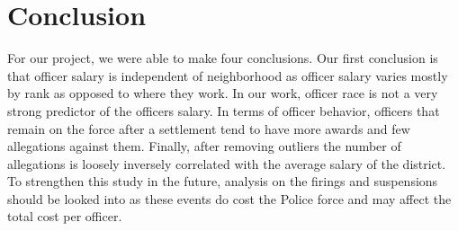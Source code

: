 \documentclass[11pt]{article}
\begin{document}
\FloatBarrier
\section{Conclusion}

For our project, we were able to make four conclusions. Our first conclusion is that officer salary is independent of neighborhood as officer salary varies mostly by rank as opposed to where they work. In our work, officer race is not a very strong predictor of the officers salary. In terms of officer behavior, officers that remain on the force after a settlement tend to have more awards and few allegations against them. Finally, after removing outliers the number of allegations is loosely inversely correlated with the average salary of the district. To strengthen this study in the future, analysis on the firings and suspensions should be looked into as these events do cost the Police force and may affect the total cost per officer.
\end{document}
